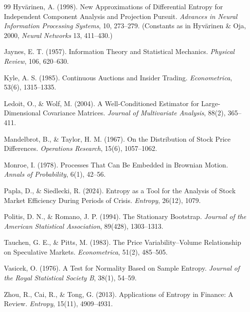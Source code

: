 \documentclass[11pt]{article}
\theoremstyle{definition}
\theoremstyle{remark}
\begin{document}
\begin{thebibliography}{99}
 Hyvärinen, A. (1998). New Approximations of Differential Entropy for Independent Component Analysis and Projection Pursuit. \textit{Advances in Neural Information Processing Systems}, 10, 273--279. (Constants as in Hyvärinen \& Oja, 2000, \textit{Neural Networks} 13, 411--430.)

 Jaynes, E. T. (1957). Information Theory and Statistical Mechanics. \textit{Physical Review}, 106, 620--630.

 Kyle, A. S. (1985). Continuous Auctions and Insider Trading. \textit{Econometrica}, 53(6), 1315--1335.

 Ledoit, O., \& Wolf, M. (2004). A Well-Conditioned Estimator for Large-Dimensional Covariance Matrices. \textit{Journal of Multivariate Analysis}, 88(2), 365--411.

 Mandelbrot, B., \& Taylor, H. M. (1967). On the Distribution of Stock Price Differences. \textit{Operations Research}, 15(6), 1057--1062.

 Monroe, I. (1978). Processes That Can Be Embedded in Brownian Motion. \textit{Annals of Probability}, 6(1), 42--56.

 Papla, D., \& Siedlecki, R. (2024). Entropy as a Tool for the Analysis of Stock Market Efficiency During Periods of Crisis. \textit{Entropy}, 26(12), 1079.

 Politis, D. N., \& Romano, J. P. (1994). The Stationary Bootstrap. \textit{Journal of the American Statistical Association}, 89(428), 1303--1313.

 Tauchen, G. E., \& Pitts, M. (1983). The Price Variability--Volume Relationship on Speculative Markets. \textit{Econometrica}, 51(2), 485--505.

 Vasicek, O. (1976). A Test for Normality Based on Sample Entropy. \textit{Journal of the Royal Statistical Society B}, 38(1), 54--59.

 Zhou, R., Cai, R., \& Tong, G. (2013). Applications of Entropy in Finance: A Review. \textit{Entropy}, 15(11), 4909--4931.

\end{thebibliography}
\end{document}
